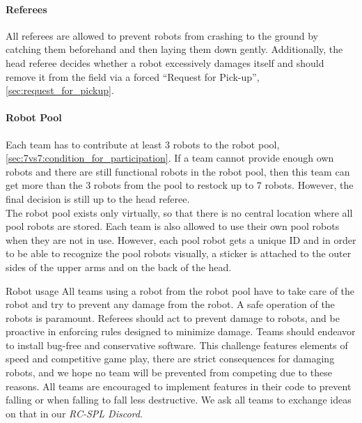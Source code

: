         \paragraph{Referees}
            \label{sec:7vs7:referee}
            All referees are allowed to prevent robots from crashing to the ground by catching them beforehand and then laying them down gently. Additionally, the head referee decides whether a robot excessively damages itself and should remove it from the field via a forced ``Request for Pick-up'', \cf \cref{sec:request_for_pickup}.

        \paragraph{Robot Pool}
            Each team has to contribute at least 3 robots to the robot pool, \cf \cref{sec:7vs7:condition_for_participation}. If a team cannot provide enough own robots and there are still functional robots in the robot pool, then this team can get more than the 3 robots from the pool to restock up to 7 robots. However, the final decision is still up to the head referee. \\
            The robot pool exists only virtually, so that there is no central location where all pool robots are stored. Each team is also allowed to use their own pool robots when they are not in use. However, each pool robot gets a unique ID and in order to be able to recognize the pool robots visually, a sticker is attached to the outer sides of the upper arms and on the back of the head.

            \begin{hintbox*}{Robot usage}
                All teams using a robot from the robot pool have to take care of the robot and try to prevent any damage from the robot. A safe operation of the robots is paramount. Referees should act to prevent damage to robots, and be proactive in enforcing rules designed to minimize damage. Teams should endeavor to install bug-free and conservative software. This challenge features elements of speed and competitive game play, there are strict consequences for damaging robots, and we hope no team will be prevented from competing due to these reasons.
                All teams are encouraged to implement features in their code to prevent falling or when falling to fall less destructive. We ask all teams to exchange ideas on that in our \textit{RC-SPL Discord}.
            \end{hintbox*}

